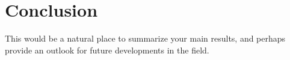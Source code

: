 \chapter{Conclusion}\noindent
This would be a natural place to summarize your main results, and perhaps provide an outlook for future developments in the field.
